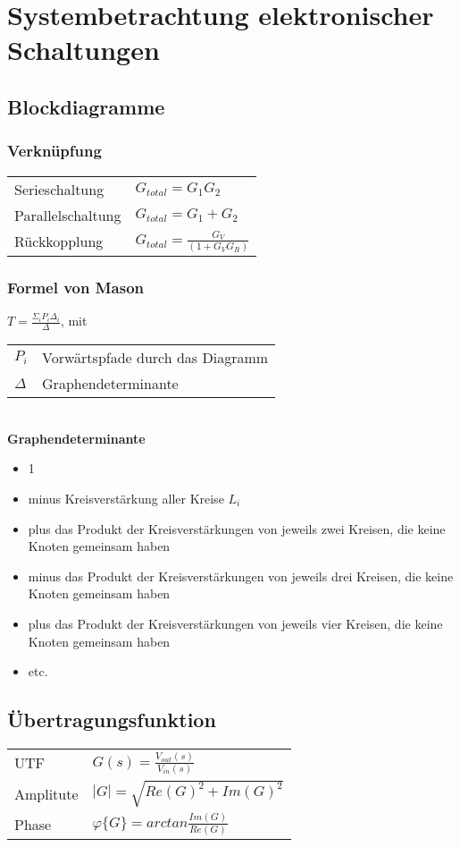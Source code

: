 \section{Systembetrachtung elektronischer Schaltungen}
\subsection{Blockdiagramme}
\subsubsection{Verknüpfung}
\begin{tabular}{ll}
Serieschaltung & $G_{total}=G_1G_2$\\
Parallelschaltung & $G_{total}=G_1+G_2$\\
Rückkopplung & $G_{total}=\frac{G_V}{(1+G_VG_R)}$\\
\end{tabular}
\subsubsection{Formel von Mason}
$T=\frac{\Sigma_iP_i\Delta_i}{\Delta}$, mit
\begin{tabular}{ll}
$P_i$ & Vorwärtspfade durch das Diagramm \\
$\Delta$ & Graphendeterminante \\
\end{tabular}\\
\textbf{Graphendeterminante}
\begin{itemize}
\item 1
\item minus Kreisverstärkung aller Kreise $L_i$
\item plus das Produkt der Kreisverstärkungen von jeweils zwei Kreisen, die keine Knoten gemeinsam haben
\item minus das Produkt der Kreisverstärkungen von jeweils drei Kreisen, die keine Knoten gemeinsam haben
\item plus das Produkt der Kreisverstärkungen von jeweils vier Kreisen, die keine Knoten gemeinsam haben
\item etc.
\end{itemize}
\subsection{Übertragungsfunktion}
\begin{tabular}{ll}
UTF & $G(s)=\frac{V_{out}(s)}{V_{in}(s)}$\\
Amplitute & $|G|=\sqrt{Re(G)^2+Im(G)^2}$\\
Phase & $\varphi\{G\}=arctan\frac{Im(G)}{Re(G)}$\\
\end{tabular}\\
